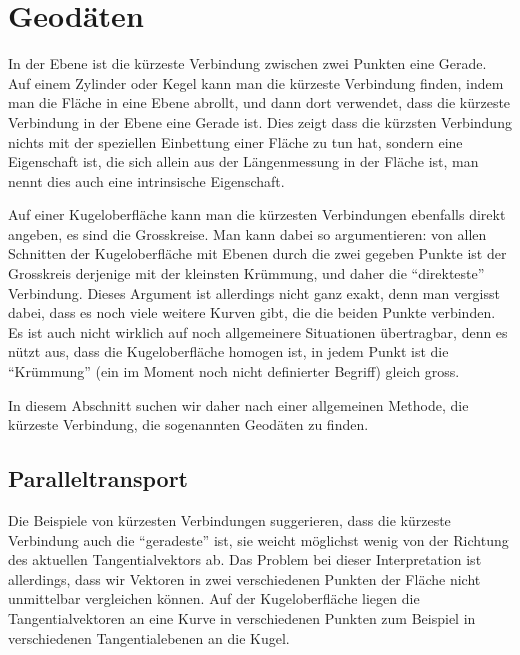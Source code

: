 %
%
%
\section{Geodäten
\label{skript:kruemmung:section:geodaeten}}
In der Ebene ist die kürzeste Verbindung zwischen zwei Punkten
eine Gerade.
Auf einem Zylinder oder Kegel kann man die kürzeste Verbindung finden,
indem man die Fläche in eine Ebene abrollt, und dann dort verwendet,
dass die kürzeste Verbindung in der Ebene eine Gerade ist.
Dies zeigt dass die kürzsten Verbindung nichts mit der speziellen
Einbettung einer Fläche zu tun hat, sondern eine Eigenschaft ist,
die sich allein aus der Längenmessung in der Fläche ist, man nennt
dies auch eine intrinsische Eigenschaft.

Auf einer Kugeloberfläche kann man die kürzesten Verbindungen ebenfalls
direkt angeben, es sind die Grosskreise.
Man kann dabei so argumentieren: von allen Schnitten der Kugeloberfläche
mit Ebenen durch die zwei gegeben Punkte ist der Grosskreis derjenige
mit der kleinsten Krümmung, und daher die ``direkteste'' Verbindung.
Dieses Argument ist allerdings nicht ganz exakt, denn man vergisst dabei,
dass es noch viele weitere Kurven gibt, die die beiden Punkte verbinden.
Es ist auch nicht wirklich auf noch allgemeinere Situationen übertragbar,
denn es nützt aus, dass die Kugeloberfläche homogen ist, in jedem Punkt
ist die ``Krümmung'' (ein im Moment noch nicht definierter Begriff) 
gleich gross.

In diesem Abschnitt suchen wir daher nach einer allgemeinen Methode,
die kürzeste Verbindung, die sogenannten Geodäten zu finden.

\subsection{Paralleltransport}
Die Beispiele von kürzesten Verbindungen suggerieren, dass die kürzeste
Verbindung auch die ``geradeste'' ist, sie weicht möglichst wenig von
der Richtung des aktuellen Tangentialvektors ab.
Das Problem bei dieser Interpretation ist allerdings, dass wir Vektoren
in zwei verschiedenen Punkten der Fläche nicht unmittelbar vergleichen
können.
Auf der Kugeloberfläche liegen die Tangentialvektoren an eine Kurve in
verschiedenen Punkten zum Beispiel in verschiedenen Tangentialebenen
an die Kugel.

